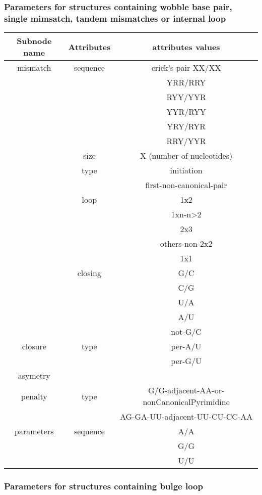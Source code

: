 \documentclass{article}
\begin{document}
\pagebreak
\subsubsection{Parameters for structures containing wobble base pair, single mimsatch, tandem mismatches or internal loop}

\begin{table}[h]
\begin{tabular}[h]{| c | c | c |}
\textbf{Subnode name} & \textbf{Attributes} & \textbf{attributes values} \\
 \hline
mismatch & sequence & crick's pair XX/XX \\
 & & YRR/RRY \\
 & & RYY/YYR \\
 & & YYR/RYY \\
 & & YRY/RYR \\
 & & RRY/YYR \\
 & size & X (number of nucleotides) \\
 & type & initiation \\
 & & first-non-canonical-pair \\
 & loop & 1x2 \\
 & & 1xn-n>2 \\
 & & 2x3 \\
 & & others-non-2x2 \\
 & & 1x1 \\
 & closing & G/C \\
 & & C/G \\
 & & U/A \\
 & & A/U \\
 & & not-G/C \\
  \hline
closure & type & per-A/U \\
 & & per-G/U \\
  \hline
asymetry & & \\
 \hline
penalty & type & G/G-adjacent-AA-or-nonCanonicalPyrimidine \\
 & & AG-GA-UU-adjacent-UU-CU-CC-AA \\
  \hline
parameters & sequence & A/A \\
 & & G/G \\
 & & U/U \\
  \hline
\end{tabular}
\end{table}

\clearpage
\subsubsection{Parameters for structures containing bulge loop}
\end{document}
